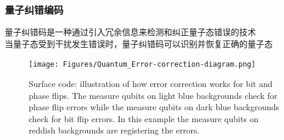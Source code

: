 \begin{frame}
    \frametitle{量子纠错编码}
        量子纠错码是一种通过引入冗余信息来检测和纠正量子态错误的技术\\
	当量子态受到干扰发生错误时，量子纠错码可以识别并恢复正确的量子态
    \begin{figure}
        \centering
                \texttt{[image: Figures/Quantum\_Error-correction-diagram.png]}
		\caption{\tiny{\textrm{Surface code: illustration of how error correction works for bit and phase flips. The measure qubits on light blue backgrounds check for phase flip errors while the measure qubits on dark blue backgrounds check for bit flip errors. In this example the measure qubits on reddish backgrounds are registering the errors.}}}
		\label{Fig:Quantum_Error-correction-diagram}
    \end{figure}
       	    \vskip -10pt
	    {\fontsize{7.5pt}{5.2pt}\selectfont{表面编码是一种常用的量子纠错码，在量子计算中可有效提高量子态的保持时间和计算的可靠性}}
\end{frame}

